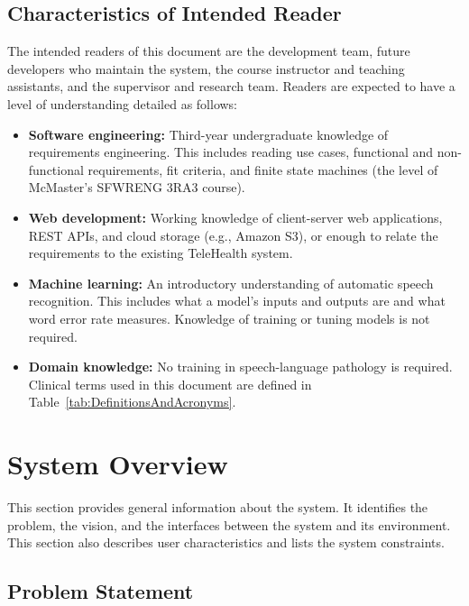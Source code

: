 \documentclass[12pt]{article}
\begin{document}
\subsection{Characteristics of Intended Reader} \label{sec_IntendedReader}

The intended readers of this document are the development team, future developers who maintain the system, the course instructor and teaching assistants, and the supervisor and research team. Readers are expected to have a level of understanding detailed as follows:
\begin{itemize}
  \item \textbf{Software engineering:} Third-year undergraduate knowledge of requirements engineering. This includes reading use cases, functional and non-functional requirements, fit criteria, and finite state machines (the level of McMaster’s SFWRENG 3RA3 course).
  \item \textbf{Web development:} Working knowledge of client-server web applications, REST APIs, and cloud storage (e.g., Amazon S3), or enough to relate the requirements to the existing TeleHealth system.
  \item \textbf{Machine learning:} An introductory understanding of automatic speech recognition. This includes what a model’s inputs and outputs are and what word error rate measures. Knowledge of training or tuning models is not required.
  \item \textbf{Domain knowledge:} No training in speech-language pathology is required. Clinical terms used in this document are defined in Table~\ref{tab:DefinitionsAndAcronyms}.
\end{itemize}

\section{System Overview} \label{sec:SystemOverview}

This section provides general information about the system.  It identifies the
problem, the vision, and the interfaces between the system and its environment.
This section also describes user characteristics and lists the system
constraints.



\subsection{Problem Statement}
\end{document}
